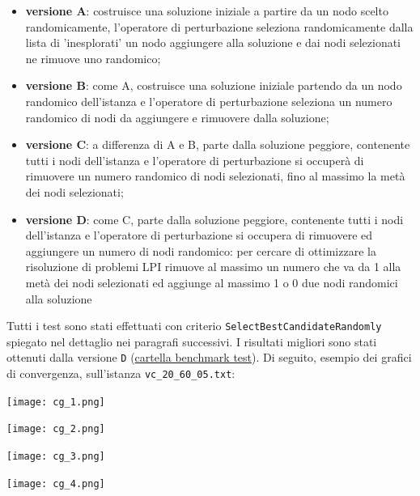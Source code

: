 \documentclass[11pt]{article}
\begin{document}
\begin{itemize}
\item{\textbf{versione A}: costruisce una soluzione iniziale a partire da un nodo scelto randomicamente, l'operatore di perturbazione seleziona randomicamente dalla lista di 'inesplorati' un nodo aggiungere alla soluzione e dai nodi selezionati ne rimuove uno randomico;}
\item{\textbf{versione B}: come A, costruisce una soluzione iniziale partendo da un nodo randomico dell'istanza e l'operatore di perturbazione seleziona un numero randomico di nodi da aggiungere e rimuovere dalla soluzione;}
\item{\textbf{versione C}: a differenza di A e B, parte dalla soluzione peggiore, contenente tutti i nodi dell'istanza e l'operatore di perturbazione si occuperà di rimuovere un numero randomico di nodi selezionati, fino al massimo la metà dei nodi selezionati; }
\item{\textbf{versione D}: come C, parte dalla soluzione peggiore, contenente tutti i nodi dell'istanza e l'operatore di perturbazione si occupera di rimuovere ed aggiungere un numero di nodi randomico: per cercare di ottimizzare la risoluzione di problemi LPI rimuove al massimo un numero che va da 1 alla metà dei nodi selezionati ed aggiunge al massimo 1 o 0 due nodi randomici alla soluzione}
\end{itemize}

\pagebreak

Tutti i test sono stati effettuati con criterio \verb|SelectBestCandidateRandomly| spiegato nel dettaglio nei paragrafi successivi.
I risultati migliori sono stati ottenuti dalla versione \verb|D| (\href{https://github.com/khalld/mwvc-using-ils/tree/main/benchmarks-test}{cartella benchmark test}). Di seguito, esempio dei grafici di convergenza, sull'istanza \verb|vc_20_60_05.txt|:

\begin{center}
    \begin{minipage}{0.48\linewidth}
    \texttt{[image: cg\_1.png]}
    \end{minipage}%
    \begin{minipage}{0.49\linewidth}
        \texttt{[image: cg\_2.png]}
    \end{minipage}
    \begin{minipage}{0.49\linewidth}
        \texttt{[image: cg\_3.png]}
    \end{minipage}
    \begin{minipage}{0.49\linewidth}
        \texttt{[image: cg\_4.png]}
    \end{minipage}
\end{center}
\end{document}
